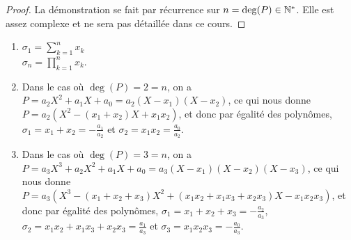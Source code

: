 \documentclass[12pt, a4paper]{report}
\begin{document}
\begin{proof}
    La démonstration se fait par récurrence sur $n = \deg(P) \in \mathbb{N}^*$. Elle est assez complexe et ne sera pas détaillée dans ce cours.
\end{proof}

\begin{remark}
    \begin{enumerate}
        \item $\sigma_1 = \sum_{k=1}^{n}x_k$\\
        $\sigma_n = \prod_{k=1}^{n} x_k$.
        \item Dans le cas où $\deg(P)=2=n$, on a $P=a_2X^2 + a_1X + a_0 = a_2(X-x_1)(X-x_2)$, ce qui nous donne $P=a_2(X^2-(x_1+x_2)X + x_1x_2)$, et donc par égalité des polynômes, $\sigma_1 = x_1 + x_2 = -\frac{a_1}{a_2}$ et $\sigma_2 = x_1x_2 = \frac{a_0}{a_2}$.
        \item Dans le cas où $\deg(P)=3=n$, on a $P=a_3X^3 + a_2X^2 + a_1X + a_0 = a_3(X-x_1)(X-x_2)(X-x_3)$, ce qui nous donne $P=a_3(X^3-(x_1+x_2+x_3)X^2 + (x_1x_2 + x_1x_3 + x_2x_3)X - x_1x_2x_3)$, et donc par égalité des polynômes, $\sigma_1 = x_1 + x_2 + x_3 = -\frac{a_2}{a_3}$, $\sigma_2 = x_1x_2 + x_1x_3 + x_2x_3 = \frac{a_1}{a_3}$ et $\sigma_3 = x_1x_2x_3 = -\frac{a_{0}}{a_{3}}$.
    \end{enumerate}
\end{remark}
\end{document}
